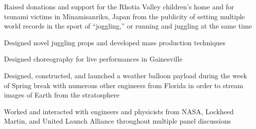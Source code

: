 \documentclass[letterpaper]{article}
\begin{document}
\begin{compactitem}
	\item Raised donations and support for the Rhotia Valley children’s home and for tsunami victims in Minamisanriku, Japan from the publicity of setting multiple world records in the sport of “joggling,” or running and juggling at the same time
\end{compactitem}

\begin{compactitem}
	\item Designed novel juggling props and developed mass production techniques\\
	\item Designed choreography for live performances in Gainesville
\end{compactitem}

\begin{compactitem}
	\item Designed, constructed, and launched a weather balloon payload during the week of Spring break with numerous other engineers from Florida in order to stream images of Earth from the stratosphere\\
	\item Worked and interacted with engineers and physicists from NASA, Lockheed Martin, and United Launch Alliance throughout multiple panel discussions
\end{compactitem}


\noindent{\Large\textbf {\\ACHIEVEMENTS}}
\end{document}

